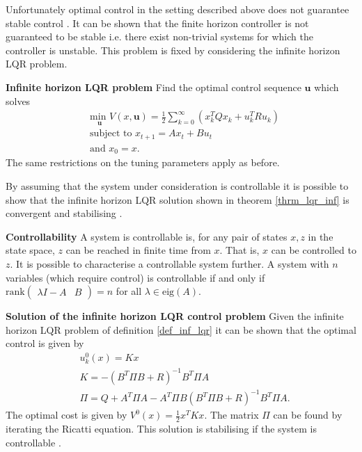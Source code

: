 Unfortunately optimal control in the setting described above does not guarantee stable control \cite{raw}. It can be shown that the finite horizon controller is not guaranteed to be stable i.e. there exist non-trivial systems for which the controller is unstable. This problem is fixed by considering the infinite horizon LQR problem. 
\begin{defn}
\textbf{Infinite horizon LQR problem} Find the optimal control sequence $\mathbf{u}$ which solves
\begin{equation}
\begin{aligned}
&\underset{\mathbf{u}}{\text{min }} V(x, \mathbf{u}) = \frac{1}{2}\sum_{k=0}^{\infty} \left( x_k^TQx_k + u_k^TRu_k \right) \\
&\text{subject to } x_{t+1} = Ax_t+Bu_t \\
&\text{and } x_0 = x.
\end{aligned}
\label{eq_inf_lqr_problem}
\end{equation}
The same restrictions on the tuning parameters apply as before.
\label{def_inf_lqr}
\end{defn}
By assuming that the system under consideration is controllable it is possible to show that the infinite horizon LQR solution shown in theorem \ref{thrm_lqr_inf} is convergent and stabilising \cite{raw}.
\begin{defn}
\textbf{Controllability} A system is controllable is, for any pair of states $x,z$ in the state space, $z$ can be reached in finite time from $x$. That is, $x$ can be controlled to $z$. It is possible to characterise a controllable system further. A system with $n$ variables (which require control) is controllable if and only if $\text{rank}\begin{pmatrix}
\lambda I- A & B
\end{pmatrix} = n$ for all $\lambda \in \text{eig}(A)$. 
\end{defn}
\begin{thrm}
\textbf{Solution of the infinite horizon LQR control problem} Given the infinite horizon LQR problem of definition \ref{def_inf_lqr} it can be shown that the optimal control is given by
\begin{equation}
\begin{aligned}
&u^0_{k}(x) = Kx \\
&K = -(B^T\Pi B+R)^{-1}B^T\Pi A \\
&\Pi = Q + A^T\Pi A-A^T\Pi B(B^T\Pi B+R)^{-1}B^T\Pi A.  
\end{aligned}
\label{eq_lqr_inf_opt_control}
\end{equation}
The optimal cost is given by $V^0(x) = \frac{1}{2}x^TKx$. The matrix $\Pi$ can be found by iterating the Ricatti equation. This solution is stabilising if the system is controllable \cite{raw}.
\label{thrm_lqr_inf}
\end{thrm}

